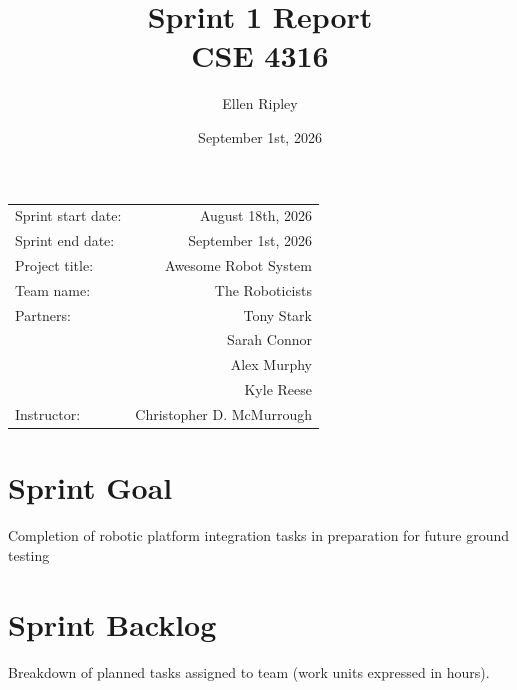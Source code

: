 \documentclass{article}
\title{Sprint 1 Report \\ CSE 4316}
\author{Ellen Ripley}
\date{September 1st, 2026}
\begin{document}
\maketitle
\begin{center}
\begin{tabular}{l r}

Sprint start date: & August 18th, 2026 \\

Sprint end date: & September 1st, 2026 \\

Project title: & Awesome Robot System \\

Team name: & The Roboticists \\

Partners: 	& Tony Stark \\
			& Sarah Connor \\
			& Alex Murphy \\
        	& Kyle Reese \\
Instructor: & Christopher D. McMurrough
\end{tabular}
\end{center}

\section{Sprint Goal}
Completion of robotic platform integration tasks in preparation for future ground testing

\section{Sprint Backlog}
Breakdown of planned tasks assigned to team (work units expressed in hours). \\ %
\end{document}
